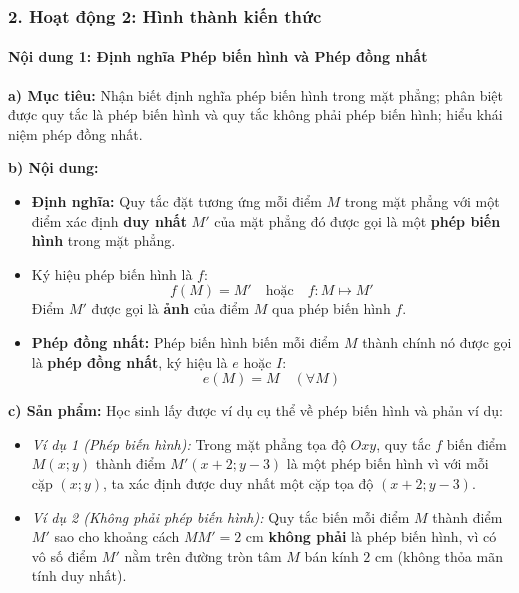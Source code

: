 \documentclass[12pt, a4paper]{article}
\begin{document}
\subsubsection*{2. Hoạt động 2: Hình thành kiến thức}

\paragraph{Nội dung 1: Định nghĩa Phép biến hình và Phép đồng nhất}
\textbf{a) Mục tiêu:} Nhận biết định nghĩa phép biến hình trong mặt phẳng; phân biệt được quy tắc là phép biến hình và quy tắc không phải phép biến hình; hiểu khái niệm phép đồng nhất.

\textbf{b) Nội dung:}
\begin{itemize}[leftmargin=0.6cm]
    \item \textbf{Định nghĩa:} Quy tắc đặt tương ứng mỗi điểm $M$ trong mặt phẳng với một điểm xác định \textbf{duy nhất} $M'$ của mặt phẳng đó được gọi là một \textbf{phép biến hình} trong mặt phẳng.
    \item Ký hiệu phép biến hình là $f$:
    $$f(M) = M' \quad \text{hoặc} \quad f: M \mapsto M'$$
    Điểm $M'$ được gọi là \textbf{ảnh} của điểm $M$ qua phép biến hình $f$.
    \item \textbf{Phép đồng nhất:} Phép biến hình biến mỗi điểm $M$ thành chính nó được gọi là \textbf{phép đồng nhất}, ký hiệu là $e$ hoặc $I$:
    $$e(M) = M \quad (\forall M)$$
\end{itemize}

\textbf{c) Sản phẩm:} Học sinh lấy được ví dụ cụ thể về phép biến hình và phản ví dụ:
\begin{itemize}[leftmargin=0.6cm]
    \item \textit{Ví dụ 1 (Phép biến hình):} Trong mặt phẳng tọa độ $Oxy$, quy tắc $f$ biến điểm $M(x; y)$ thành điểm $M'(x + 2; y - 3)$ là một phép biến hình vì với mỗi cặp $(x; y)$, ta xác định được duy nhất một cặp tọa độ $(x + 2; y - 3)$.
    \item \textit{Ví dụ 2 (Không phải phép biến hình):} Quy tắc biến mỗi điểm $M$ thành điểm $M'$ sao cho khoảng cách $MM' = 2\text{ cm}$ \textbf{không phải} là phép biến hình, vì có vô số điểm $M'$ nằm trên đường tròn tâm $M$ bán kính $2\text{ cm}$ (không thỏa mãn tính duy nhất).
\end{itemize}
\end{document}
